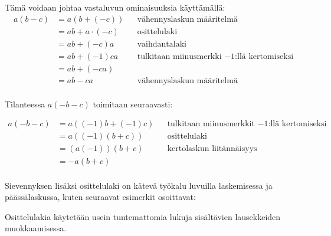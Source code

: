 Tämä voidaan johtaa vastaluvun ominaisuuksia käyttämällä:
\begin{align*}
	a(b-c)
	&=a(b+(-c)) && \text{vähennyslaskun määritelmä} \\
	&=ab+a\cdot (-c) && \text{osittelulaki} \\
	&=ab+ (-c)a && \text{vaihdantalaki} \\
	&=ab+ (-1)ca && \text{tulkitaan miinusmerkki $-1$:llä kertomiseksi} \\
	&=ab+ (-ca)&& \text{} \\
	&=ab-ca && \text{vähennyslaskun määritelmä} \\
	\end{align*}	
	
Tilanteessa $a(-b-c)$ toimitaan seuraavasti:

\begin{align*}
	a(-b-c)
	&=a((-1)b+(-1)c) && \text{tulkitaan miinusmerkkit $-1$:llä kertomiseksi} \\
	&=a((-1)(b+c)) && \text{osittelulaki} \\
	&=(a(-1))(b+c) && \text{kertolaskun liitännäisyys} \\
	&=-a(b+c) && \text{} \\
	\end{align*}	

Sievennyksen lisäksi osittelulaki on kätevä työkalu luvuilla laskemisessa ja päässälaskussa, kuten seuraavat esimerkit osoittavat:

\begin{esimerkki}
\end{esimerkki}

Osittelulakia käytetään usein tuntemattomia lukuja sisältävien lausekkeiden muokkaamisessa.

\begin{esimerkki}
\end{esimerkki}

